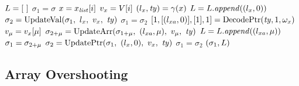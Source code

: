\begin{algorithm*}\footnotesize
\caption{$(\sigma_1, \locL) \gets \ResolveS(\x_{\vl}, \Acc, \gamma, \sigma, \valL)$}
\label{algo: resolve S}
\begin{algorithmic}
	\STATE $L = [\ ]$
	\STATE $\sigma_1 = \sigma$
		\STATE $x = x_{\mathit{list}}[i]$
		\STATE $v_x = V[i]$
		\STATE $(l_x, \mathit{ty}) = \gamma(x)$
		\STATE $L = L.\mathit{append}((l_x, 0))$
		\IF{ $(\Type = \Priv\ \btype)$ }	
			\STATE $\sigma_2 = \Update(\sigma_1,\ \loc_\x,\ \val_\x,\ \Type)$
			\STATE $\sigma_1 = \sigma_2$
		\ELSIF{ $(\Type = \Priv\ \Const\ \btype*)$ }	
			\STATE $[1, [(l_{xa}, 0)], [1], 1] = \mathrm{DecodePtr}(\mathit{ty}, 1, \omega_{x})$
				\STATE $v_{\mu} = v_x[\mu]$
				\STATE $\sigma_{2+\offset} = \UpdateArr(\sigma_{1+\offset},\ (\loc_{xa},\offset),\ \val_\offset,\ \Type)$
				\STATE $L = L.\mathit{append}((l_{xa}, \mu))$
			\ENDFOR
			\STATE $\sigma_1 = \sigma_{2+\mu}$
		\ELSIF{$(\Type = \Priv\ \btype*)$}	
			\STATE $\sigma_2 = \UpdatePtr(\sigma_1,\ (\loc_\x, 0),\ \val_\x,\ \Type)$ 
			\STATE $\sigma_1 = \sigma_2$
		\ENDIF	
	\ENDFOR
	\RETURN $(\sigma_1, L)$	
\end{algorithmic}
\end{algorithm*}





\subsection{Array Overshooting}
\label{app: array oob}

\begin{minipage}{\textwidth}
\label{Fig: arr oob read vanC}
\end{minipage}






